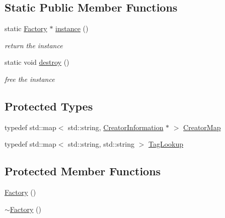 \subsection*{Static Public Member Functions}
\begin{DoxyCompactItemize}
\item 
static \hyperlink{classg2o_1_1Factory}{Factory} $\ast$ \hyperlink{classg2o_1_1Factory_a8a1f33e017c5ad59399cef48972578ae}{instance} ()
\begin{DoxyCompactList}\small\item\em return the instance \end{DoxyCompactList}\item 
static void \hyperlink{classg2o_1_1Factory_ab40f0aa18dabb91a35de7186ede9355a}{destroy} ()
\begin{DoxyCompactList}\small\item\em free the instance \end{DoxyCompactList}\end{DoxyCompactItemize}
\subsection*{Protected Types}
\begin{DoxyCompactItemize}
\item 
typedef std\+::map$<$ std\+::string, \hyperlink{classg2o_1_1Factory_1_1CreatorInformation}{Creator\+Information} $\ast$ $>$ \hyperlink{classg2o_1_1Factory_a639c8d850892dddc20098e9aa97ef9e8}{Creator\+Map}
\item 
typedef std\+::map$<$ std\+::string, std\+::string $>$ \hyperlink{classg2o_1_1Factory_aba274179c053b3b71dcef6a20c898496}{Tag\+Lookup}
\end{DoxyCompactItemize}
\subsection*{Protected Member Functions}
\begin{DoxyCompactItemize}
\item 
\hyperlink{classg2o_1_1Factory_af8b5afc514363e6f00c61e8acd67b495}{Factory} ()
\item 
\hyperlink{classg2o_1_1Factory_a4b7c6970f55045ee632e6276387d0223}{$\sim$\+Factory} ()
\end{DoxyCompactItemize}
